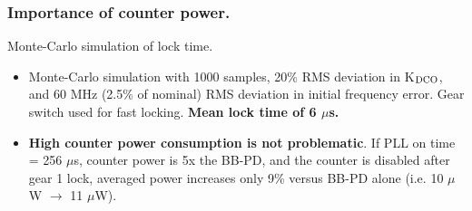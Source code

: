 \documentclass[t, screen, aspectratio=43]{beamer}
\begin{document}
\begin{frame}
	\frametitle{Importance of counter power.}
	\begin{block}{Monte-Carlo simulation of lock time.}
	\tiny


	\begin{itemize}[itemsep=4pt,label=\protect---]
		\item Monte-Carlo simulation with 1000 samples, 20\% RMS deviation in K$_{\textnormal{DCO}}$, and 60 MHz (2.5\% of nominal) RMS deviation in initial frequency error. Gear switch used for fast locking. \textbf{Mean lock time of 6 $\mu$s. }
		\item\textbf{High counter power consumption is not problematic}. If PLL on time = 256 $\mu$s, counter power is 5x the BB-PD, and the counter is disabled after gear 1 lock, averaged power increases only 9\% versus BB-PD alone (i.e. 10 $\mu$W $\rightarrow$ 11 $\mu$W).
	\end{itemize}


\end{block}
\end{frame}
\end{document}
